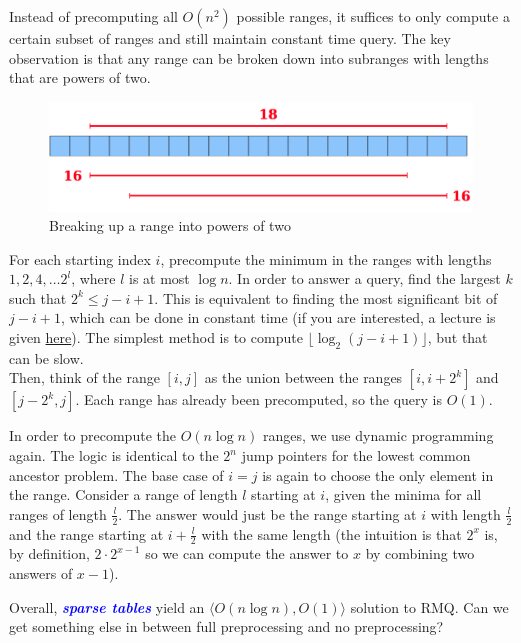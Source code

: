 \documentclass[11pt, oneside]{article}
\newcommand{\emphasis}[1]{\textcolor{blue}{\textbf{\textit{#1}}}}
\begin{document}
Instead of precomputing all \( O(n^2) \) possible ranges, it suffices to only compute a certain subset of ranges
and still maintain constant time query. The key observation is that any range can be broken down into subranges
with lengths that are powers of two.

\begin{figure}[h!]
\centering
\includegraphics[scale=0.25]{sparse_decomp}
\caption{Breaking up a range into powers of two}
\end{figure}

For each starting index \( i \), precompute the minimum in the ranges with lengths
\( 1, 2, 4, \dots 2^l \), where \( l \) is at most \( \log n \). In order to answer a query,
find the largest \( k \) such that \( 2^k \leq j - i + 1 \). This is equivalent to finding the
most significant bit of \( j - i + 1 \), which can be done in constant time (if you are interested,
a lecture is given \href{http://web.stanford.edu/class/cs166/lectures/16/Slides16.pdf}{here}).
The simplest method is to compute \( \lfloor \log_2{(j - i + 1)} \rfloor \), but that can be slow.
\\
Then, think of the range \( [i, j] \) as the union between the ranges \( [i, i + 2^k] \) and \( [j - 2^k, j] \).
Each range has already been precomputed, so the query is \( O(1) \).

In order to precompute the \( O(n \log n) \) ranges, we use dynamic programming again.
The logic is identical to the \( 2^n \) jump pointers for the lowest common ancestor problem.
The base case of \( i = j \) is again to choose the only element in the range. Consider a range of length \( l \) starting
at \( i \), given the minima for all ranges of length \( \frac{l}{2} \). The answer would just be
the range starting at \( i \) with length \( \frac{l}{2} \) and the range starting at \( i + \frac{l}{2} \)
with the same length (the intuition is that \( 2^x \) is, by definition, \( 2 \cdot 2^{x - 1} \) so we can compute the answer to \( x \)
by combining two answers of \( x - 1 \)).

Overall, \emphasis{sparse tables} yield an \( \langle O(n \log n), O(1) \rangle \) solution to RMQ.
Can we get something else in between full preprocessing and no preprocessing?
\end{document}

